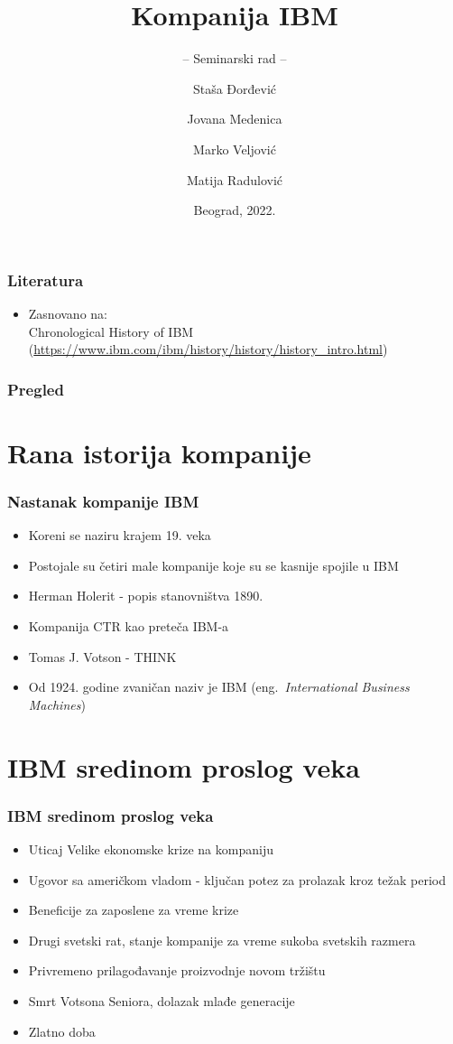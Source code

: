 \documentclass{beamer}
\title[]{Kompanija IBM}
\subtitle{-- Seminarski rad --}
\author[]{Staša Đorđević\and
Jovana Medenica\\\and  
Marko Veljović\and
Matija Radulović}
\institute[]{Matematički fakultet\\Univerzitet u Beogradu}
\date{
    \footnotesize{Beograd, 2022.}	
}
\begin{document}
\begin{frame}
	\thispagestyle{empty}
	\titlepage
\end{frame}

\begin{frame}[fragile]\frametitle{Literatura}
	\begin{itemize}
		\item Zasnovano na:\\
		Chronological History of IBM
		(\url{https://www.ibm.com/ibm/history/history/history_intro.html})
	\end{itemize}
\end{frame}

\begin{frame}
	\frametitle{Pregled} %
	\tableofcontents[hidesubsections] 
\end{frame}

\section{Rana istorija kompanije}

\begin{frame}[fragile]\frametitle{Nastanak kompanije IBM}
	\begin{itemize}	
		\item Koreni se naziru krajem 19. veka
		\item Postojale su četiri male kompanije koje su se kasnije spojile u IBM
		\item Herman Holerit - popis stanovništva 1890.
		\item Kompanija CTR kao preteča IBM-a
		\item Tomas J. Votson - THINK
		\item Od 1924. godine zvaničan naziv je IBM (eng.~{\em International Business Machines})
		\end{itemize}
\end{frame}

\section{IBM sredinom proslog veka}

\begin{frame}[fragile]\frametitle{IBM sredinom proslog veka}
	\begin{itemize}	
		\item Uticaj Velike ekonomske krize na kompaniju
		\item Ugovor sa američkom vladom - ključan potez za prolazak kroz težak period
		\item Beneficije za zaposlene za vreme krize
            \item Drugi svetski rat, stanje kompanije za vreme sukoba svetskih razmera
            \item Privremeno prilagođavanje proizvodnje novom tržištu
            \item Smrt Votsona Seniora, dolazak mlađe generacije
            \item Zlatno doba
	\end{itemize}
\end{frame}
\end{document}
